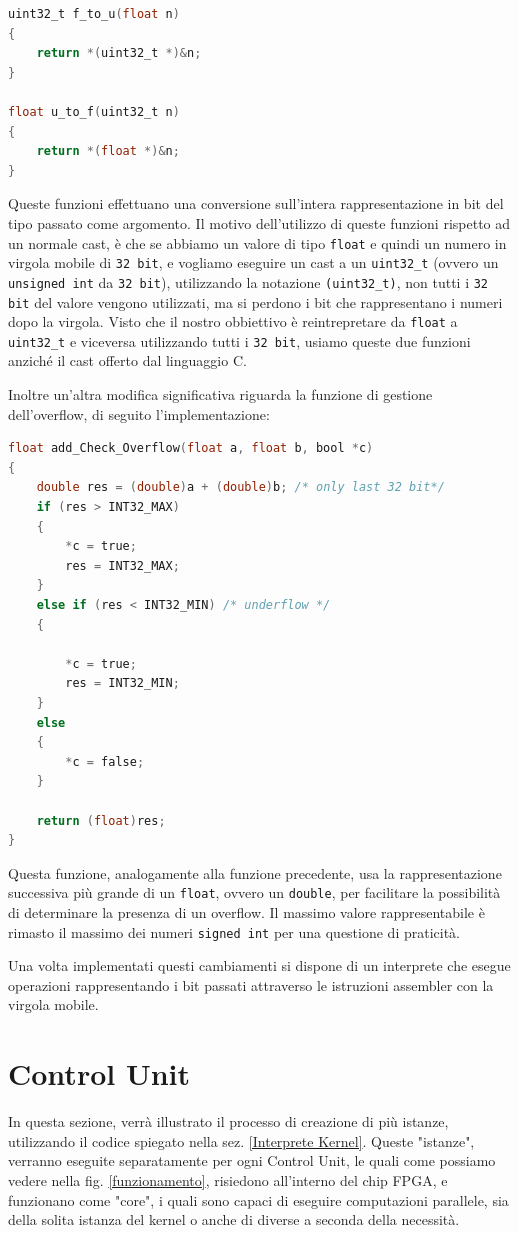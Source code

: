 \begin{lstlisting}[language=C]
uint32_t f_to_u(float n)
{
	return *(uint32_t *)&n;
}

float u_to_f(uint32_t n)
{
	return *(float *)&n;
}
\end{lstlisting}

Queste funzioni effettuano una conversione sull'intera rappresentazione in bit del tipo passato come argomento. Il motivo dell'utilizzo di queste funzioni rispetto ad un normale cast, è che se abbiamo un valore di tipo \texttt{float} e quindi un numero in virgola mobile di \texttt{32 bit}, e vogliamo eseguire un cast a un \texttt{uint32\_t} (ovvero un \texttt{unsigned int} da \texttt{32 bit}), utilizzando la notazione \texttt{(uint32\_t)}, non tutti i \texttt{32 bit} del valore vengono utilizzati, ma si perdono i bit che rappresentano i numeri dopo la virgola. Visto che il nostro obbiettivo è reintrepretare da \texttt{float} a \texttt{uint32\_t} e viceversa utilizzando tutti i \texttt{32 bit}, usiamo queste due funzioni anziché il cast offerto dal linguaggio C.

\vspace{0.3cm}

Inoltre un'altra modifica significativa riguarda la funzione di gestione dell'overflow, di seguito l'implementazione:
\begin{lstlisting}[language=C]
float add_Check_Overflow(float a, float b, bool *c)
{
	double res = (double)a + (double)b; /* only last 32 bit*/
	if (res > INT32_MAX)
	{
		*c = true;
		res = INT32_MAX;
	}
	else if (res < INT32_MIN) /* underflow */
	{

		*c = true;
		res = INT32_MIN;
	}
	else
	{
		*c = false;
	}

	return (float)res;
}
\end{lstlisting}
Questa funzione, analogamente alla funzione precedente, usa la rappresentazione successiva più grande di un \texttt{float}, ovvero un \texttt{double}, per facilitare la possibilità di determinare la presenza di un overflow. Il massimo valore rappresentabile è rimasto il massimo dei numeri \texttt{signed int} per una questione di praticità.

Una volta implementati questi cambiamenti si dispone di un interprete che esegue operazioni rappresentando i bit passati attraverso le istruzioni assembler con la virgola mobile.

\section{Control Unit}
\label{ControlUnit}
In questa sezione, verrà illustrato il processo di creazione di più istanze, utilizzando il codice spiegato nella sez. \ref{Interprete Kernel}.
Queste "istanze", verranno eseguite separatamente per ogni Control Unit, le quali come possiamo vedere nella fig. \ref{funzionamento}, risiedono all'interno del chip FPGA, e funzionano come "core", i quali sono capaci di eseguire computazioni parallele, sia della solita istanza del kernel o anche di diverse a seconda della necessità.

